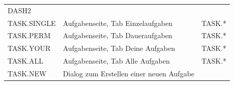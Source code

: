 \documentclass[
  12pt,
  ngerman,
  a4paper,
]{article}
\begin{document}
\begin{longtable}[]{@{}lll@{}}
\begin{minipage}[t]{0.28\columnwidth}
DASH2\strut
\end{minipage}\tabularnewline
\begin{minipage}[t]{0.27\columnwidth}\raggedright
TASK.SINGLE\strut
\end{minipage} & \begin{minipage}[t]{0.35\columnwidth}\raggedright
Aufgabenseite, Tab Einzelaufgaben\strut
\end{minipage} & \begin{minipage}[t]{0.28\columnwidth}\raggedright
TASK.*\strut
\end{minipage}\tabularnewline
\begin{minipage}[t]{0.27\columnwidth}\raggedright
TASK.PERM\strut
\end{minipage} & \begin{minipage}[t]{0.35\columnwidth}\raggedright
Aufgabenseite, Tab Daueraufgaben\strut
\end{minipage} & \begin{minipage}[t]{0.28\columnwidth}\raggedright
TASK.*\strut
\end{minipage}\tabularnewline
\begin{minipage}[t]{0.27\columnwidth}\raggedright
TASK.YOUR\strut
\end{minipage} & \begin{minipage}[t]{0.35\columnwidth}\raggedright
Aufgabenseite, Tab Deine Aufgaben\strut
\end{minipage} & \begin{minipage}[t]{0.28\columnwidth}\raggedright
TASK.*\strut
\end{minipage}\tabularnewline
\begin{minipage}[t]{0.27\columnwidth}\raggedright
TASK.ALL\strut
\end{minipage} & \begin{minipage}[t]{0.35\columnwidth}\raggedright
Aufgabenseite, Tab Alle Aufgaben\strut
\end{minipage} & \begin{minipage}[t]{0.28\columnwidth}\raggedright
TASK.*\strut
\end{minipage}\tabularnewline
\begin{minipage}[t]{0.27\columnwidth}\raggedright
TASK.NEW\strut
\end{minipage} & \begin{minipage}[t]{0.35\columnwidth}\raggedright
Dialog zum Erstellen einer neuen Aufgabe\strut
\end{minipage} & \begin{minipage}[t]{0.28\columnwidth}\raggedright

\end{minipage}
\end{longtable}
\end{document}
